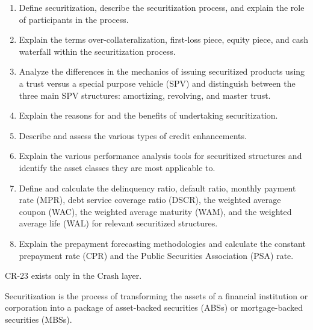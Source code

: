 
\begin{crkeybox}
\begin{enumerate}[label=\textbf{\alph*.},leftmargin=2em]
\item Define securitization, describe the securitization process, and explain the role of participants in the process.
\item Explain the terms over-collateralization, first-loss piece, equity piece, and cash waterfall within the securitization process.
\item Analyze the differences in the mechanics of issuing securitized products using a trust versus a special purpose vehicle (SPV) and distinguish between the three main SPV structures: amortizing, revolving, and master trust.
\item Explain the reasons for and the benefits of undertaking securitization.
\item Describe and assess the various types of credit enhancements.
\item Explain the various performance analysis tools for securitized structures and identify the asset classes they are most applicable to.
\item Define and calculate the delinquency ratio, default ratio, monthly payment rate (MPR), debt service coverage ratio (DSCR), the weighted average coupon (WAC), the weighted average maturity (WAM), and the weighted average life (WAL) for relevant securitized structures.
\item Explain the prepayment forecasting methodologies and calculate the constant prepayment rate (CPR) and the Public Securities Association (PSA) rate.
\end{enumerate}
\end{crkeybox}

\begin{crtrapbox}
CR-23 exists only in the Crash layer.
\end{crtrapbox}


\begin{crdefbox}[Securitization]
Securitization is the process of transforming the  assets of a
financial institution or corporation into a package of asset-backed securities
(ABSs) or mortgage-backed securities (MBSs).
\end{crdefbox}

